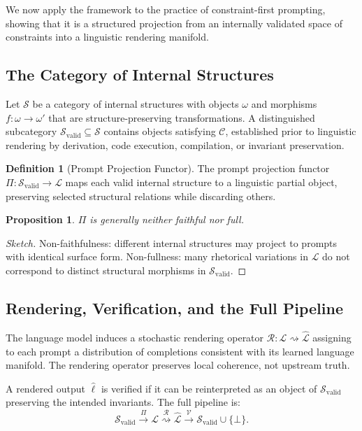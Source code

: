 \documentclass[12pt, a4paper]{article}
\newcommand{\xrightsquigarrow}[1]{%
  \mathrel{\overset{#1}{\rightsquigarrow}}%
}
\theoremstyle{plain}
\newtheorem{proposition}[theorem]{Proposition}
\theoremstyle{definition}
\newtheorem{definition}[theorem]{Definition}
\theoremstyle{remark}
\begin{document}
We now apply the framework to the practice of constraint-first prompting, showing that it is a structured projection from an internally validated space of constraints into a linguistic rendering manifold.

\subsection{The Category of Internal Structures}

Let $\mathcal{S}$ be a category of internal structures with objects $\omega$ and morphisms $f : \omega \to \omega'$ that are structure-preserving transformations. A distinguished subcategory $\mathcal{S}_{\mathrm{valid}} \subseteq \mathcal{S}$ contains objects satisfying $\mathcal{C}$, established prior to linguistic rendering by derivation, code execution, compilation, or invariant preservation.

\begin{definition}[Prompt Projection Functor]
The prompt projection functor $\Pi : \mathcal{S}_{\mathrm{valid}} \to \mathcal{L}$ maps each valid internal structure to a linguistic partial object, preserving selected structural relations while discarding others.
\end{definition}

\begin{proposition}
$\Pi$ is generally neither faithful nor full.
\end{proposition}

\begin{proof}[Sketch]
Non-faithfulness: different internal structures may project to prompts with identical surface form. Non-fullness: many rhetorical variations in $\mathcal{L}$ do not correspond to distinct structural morphisms in $\mathcal{S}_{\mathrm{valid}}$.
\end{proof}

\subsection{Rendering, Verification, and the Full Pipeline}

The language model induces a stochastic rendering operator $\mathcal{R} : \mathcal{L} \rightsquigarrow \widehat{\mathcal{L}}$ assigning to each prompt a distribution of completions consistent with its learned language manifold. The rendering operator preserves local coherence, not upstream truth.

A rendered output $\hat{\ell}$ is verified if it can be reinterpreted as an object of $\mathcal{S}_{\mathrm{valid}}$ preserving the intended invariants. The full pipeline is:
\[
\mathcal{S}_{\mathrm{valid}}
\xrightarrow{\Pi}
\mathcal{L}
\xrightsquigarrow{\mathcal{R}}
\widehat{\mathcal{L}}
\xrightarrow{\mathcal{V}}
\mathcal{S}_{\mathrm{valid}} \cup \{\bot\}.
\]
\end{document}
